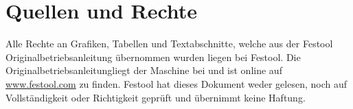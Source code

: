 \documentclass{\basedir/fablab-document}
\begin{document}
\newpage
\section{Quellen und Rechte}
\label{quellen}
Alle Rechte an Grafiken, Tabellen und Textabschnitte, welche aus der Festool Originalbetriebsanleitung übernommen wurden liegen bei Festool. Die \glqq Originalbetriebsanleitung\grqq liegt der Maschine bei und ist online auf \url{www.festool.com} zu finden. Festool hat dieses Dokument weder gelesen, noch auf Vollständigkeit oder Richtigkeit geprüft und übernimmt keine Haftung.
\end{document}
